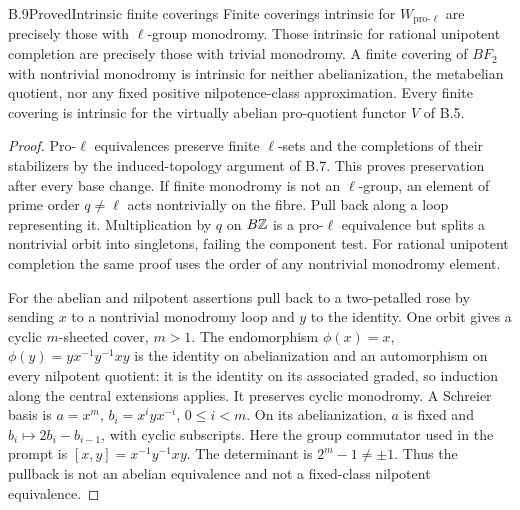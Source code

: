 \begin{statement}{B.9}{Proved}{Intrinsic finite coverings}
Finite coverings intrinsic for $W_{\mathrm{pro}\text{-}\ell}$
are precisely those with $\ell$-group monodromy. Those intrinsic
for rational unipotent completion are precisely those with
trivial monodromy. A finite covering of $BF_2$ with nontrivial
monodromy is intrinsic for neither abelianization, the metabelian
quotient, nor any fixed positive nilpotence-class approximation.
Every finite covering is intrinsic for the virtually abelian
pro-quotient functor $V$ of B.5.
\end{statement}
\begin{proof}
Pro-$\ell$ equivalences preserve finite $\ell$-sets and the
completions of their stabilizers by the induced-topology
argument of B.7. This proves preservation after every base
change. If finite monodromy is not an $\ell$-group, an element
of prime order $q\ne\ell$ acts nontrivially on the fibre.
Pull back along a loop representing it. Multiplication by $q$
on $B\mathbb Z$ is a pro-$\ell$ equivalence but splits a nontrivial
orbit into singletons, failing the component test. For rational
unipotent completion the same proof uses the order of any
nontrivial monodromy element.

For the abelian and nilpotent assertions pull back to a two-petalled rose by
sending $x$ to a nontrivial monodromy loop and $y$ to the
identity. One orbit gives a cyclic $m$-sheeted cover, $m>1$.
The endomorphism $\phi(x)=x$, $\phi(y)=yx^{-1}y^{-1}xy$ is the
identity on abelianization and an automorphism on every
nilpotent quotient: it is the identity on its associated
graded, so induction along the central extensions applies.
It preserves cyclic monodromy. A Schreier basis is
$a=x^m$, $b_i=x^iyx^{-i}$, $0\le i<m$. On its abelianization,
$a$ is fixed and $b_i\mapsto2b_i-b_{i-1}$, with cyclic
subscripts. Here the group commutator used in the prompt is $[x,y]=x^{-1}y^{-1}xy$.
The determinant is $2^m-1\ne\pm1$. Thus the pullback is
not an abelian equivalence and not a fixed-class nilpotent
equivalence.


\end{proof}
